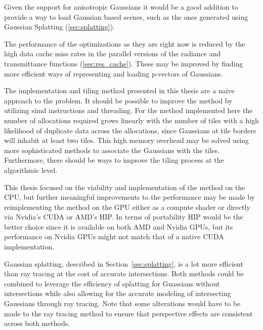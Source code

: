 \documentclass[a4paper, 11pt]{memoir}
\begin{document}
    Given the support for anisotropic Gaussians it would be a good addition to provide a way to load Gaussian based scenes,
    such as the ones generated using Gaussian Splatting (\ref{sec:splatting}).

    The performance of the optimizations as they are right now is reduced by the high data cache miss rates in the parallel
    versions of the \gls{radiance} and \gls{transmittance} functions (\ref{sec:res_cache}). These may be improved by
    finding more efficient ways of representing and loading p-vectors of Gaussians.

    The implementation and tiling method presented in this thesis are a naive approach to the problem. It should be possible
    to improve the method by utilizing \gls{simd} instructions and threading. For the method implemented here the number
    of allocations required grows linearly with the number of tiles with a high likelihood of duplicate data across the
    allocations, since Gaussians at tile borders will inhabit at least two tiles. This high memory overhead may be solved
    using more sophisticated methods to associate the Gaussians with the tiles. Furthermore, there should be ways to
    improve the tiling process at the algorithmic level.

    This thesis focused on the viability and implementation of the method on the CPU, but further meaningful improvements
    to the performance may be made by reimplementing the method on the GPU either as a compute shader or directly via
    Nvidia's CUDA or AMD's HIP. In terms of portability HIP would be the better choice since it is available on both AMD
    and Nvidia GPUs, but its performance on Nvidia GPUs might not match that of a native CUDA implementation.

    Gaussian splatting, described in Section~\ref{sec:splatting}, is a lot more efficient than ray tracing at the cost
    of accurate intersections. Both methods could be combined to leverage the efficiency of splatting for Guassians
    without intersections while also allowing for the accurate modeling of intersecting Gaussians through ray tracing.
    Note that some alterations would have to be made to the ray tracing method to ensure that perspective effects are
    consistent across both methods.

    \appendix
\end{document}

